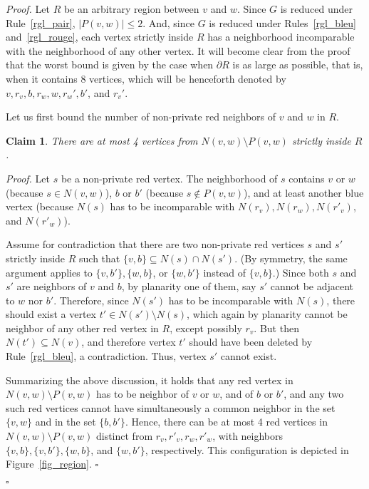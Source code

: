\documentclass[a4paper,11pt]{article}
\newtheorem{claimN} {Claim}
\newcommand{\rrgl}   [1] {Rule~\ref{#1}\xspace}
\newenvironment{proof}{\noindent \textit{Proof. }}{\hfill$\square$\vspace{.2cm}}
\begin{document}
\begin{proof}
Let $R$ be an arbitrary region between $v$ and $w$. Since $G$ is reduced under \rrgl{rgl_pair}, $|P(v,w)| \leq 2$. And, since $G$ is reduced under Rules~\ref{rgl_bleu} and~\ref{rgl_rouge}, each vertex strictly inside $R$ has a neighborhood incomparable with the neighborhood of any other vertex. It will become clear from the proof  that the worst bound is given by the case when $\partial R$ is as large as possible, that is, when it contains 8 vertices, which will be henceforth denoted by $v,r_v,b,r_w,w,r_w',b'$, and $r_v'$.

Let us first bound the number of non-private red neighbors of $v$ and $w$ in $R$.

\begin{claimN}\label{fact:non-private}
There are at most 4 vertices from  $N(v,w) \setminus P(v,w)$ strictly inside $R$.
\end{claimN}
\begin{proof}
Let $s$ be a non-private red vertex. The neighborhood of $s$ contains $v$ or $w$ (because $s \in N(v,w)$), $b$ or $b'$ (because $ s \notin P(v,w)$), and  at least another blue vertex (because $N(s)$ has to be incomparable with $N(r_v), N(r_w), N(r'_v)$, and $N(r'_w)$).

Assume for contradiction that there are two non-private red vertices $s$ and $s'$ strictly inside $R$ such that $\{v,b\} \subseteq N(s) \cap N(s')$. (By symmetry, the same argument applies to $\{v,b'\}, \{w,b\}$, or $\{w,b'\}$ instead of $\{v,b\}$.) Since both $s$ and $s'$ are neighbors of $v$ and $b$, by planarity one of them, say $s'$ cannot be adjacent to $w$ nor $b'$. Therefore, since $N(s')$ has to be incomparable with $N(s)$, there should exist a vertex $t' \in N(s') \setminus N(s)$, which again by planarity cannot be neighbor of any other red vertex in $R$, except possibly $r_v$. But then $N(t') \subseteq N(v)$, and therefore vertex $t'$ should have been deleted by Rule~\ref{rgl_bleu}, a contradiction. Thus, vertex $s'$ cannot exist.

Summarizing the above discussion, it holds that any red vertex in $N(v,w) \setminus P(v,w)$ has to be neighbor of $v$ or $w$, and of $b$ or $b'$, and any two such red vertices  cannot have simultaneously a common neighbor in the set $\{v,w\}$ and in the set $\{b,b'\}$. Hence, there can be at most 4 red vertices in $N(v,w) \setminus P(v,w)$ distinct from $r_v,r'_v,r_w,r'_w$, with neighbors $\{v,b\}, \{v,b'\}, \{w,b\}$, and $\{w,b'\}$, respectively. This configuration is depicted in Figure~\ref{fig_region}.
\end{proof}



\end{proof}
\end{document}

